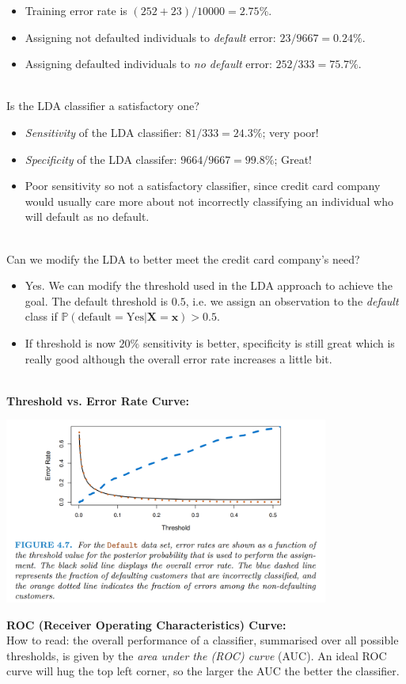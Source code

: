 \documentclass[11pt]{article}
\begin{document}
\begin{itemize}
    \item Training error rate is $(252+23)/10000 = 2.75\%$.
    \item Assigning not defaulted individuals to \textit{default} error: $23/9667 = 0.24\%$.
    \item Assigning defaulted individuals to \textit{no default} error: $252/333 = 75.7\%$.
\end{itemize}
\phantom{i} \\
\noindent Is the LDA classifier a satisfactory one?
\begin{itemize}
    \item \textit{Sensitivity} of the LDA classifier: $81/333 = 24.3\%$; very poor!
    \item \textit{Specificity} of the LDA classifer: $9664/9667 = 99.8\%$; Great!
    \item Poor sensitivity so not a satisfactory classifier, since credit card company would usually care more about not incorrectly classifying an individual who will default as no default.
\end{itemize}
\phantom{i} \\
\noindent Can we modify the LDA to better meet the credit card company's need?
\begin{itemize}
    \item Yes. We can modify the threshold used in the LDA approach to achieve the goal. The default threshold is $0.5$, i.e. we assign an observation to the \textit{default} class if $\mathbb{P}(\text{default} = \text{Yes}|\boldsymbol{X} = \boldsymbol{x}) > 0.5$.
    \item If threshold is now $20\%$ sensitivity is better, specificity is still great which is really good although the overall error rate increases a little bit.
\end{itemize}
\phantom{i} \\
\noindent \textbf{Threshold vs. Error Rate Curve:}
\begin{center}
  \includegraphics[width=0.8\textwidth]{LDA Example Threshold vs Error Rate.png}
\end{center}
\vspace{7em}
\noindent \textbf{ROC (Receiver Operating Characteristics) Curve:} \\
\noindent How to read: the overall performance of a classifier, summarised over all possible thresholds, is given by the \textit{area under the (ROC) curve} (AUC). An ideal ROC curve will hug the top left corner, so the larger the AUC the better the classifier. \\
\end{document}
